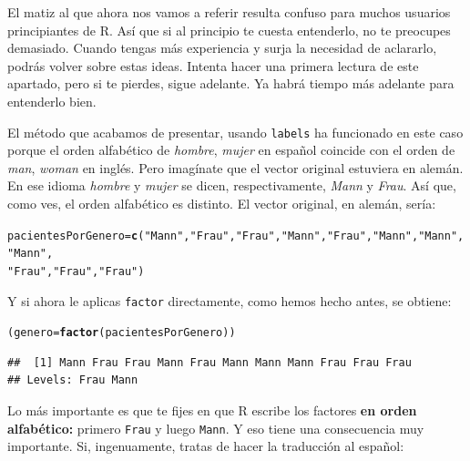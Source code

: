 \documentclass[10pt,a4paper]{article}\usepackage[]{graphicx}\usepackage[]{color}
\makeatletter
\newcommand{\hlstr}[1]{\textcolor[rgb]{0.192,0.494,0.8}{#1}}%
\newcommand{\hlstd}[1]{\textcolor[rgb]{0.345,0.345,0.345}{#1}}%
\newcommand{\hlkwb}[1]{\textcolor[rgb]{0.69,0.353,0.396}{#1}}%
\newcommand{\hlkwd}[1]{\textcolor[rgb]{0.737,0.353,0.396}{\textbf{#1}}}%
\newenvironment{kframe}{%
 \def\at@end@of@kframe{}%
 \ifinner\ifhmode%
  \def\at@end@of@kframe{\end{minipage}}%
  \begin{minipage}{\columnwidth}%
 \fi\fi%
 \def\FrameCommand##1{\hskip\@totalleftmargin \hskip-\fboxsep
 \colorbox{shadecolor}{##1}\hskip-\fboxsep
     \hskip-\linewidth \hskip-\@totalleftmargin \hskip\columnwidth}%
 \MakeFramed {\advance\hsize-\width
   \@totalleftmargin\z@ \linewidth\hsize
   \@setminipage}}%
 {\par\unskip\endMakeFramed%
 \at@end@of@kframe}
\newenvironment{knitrout}{}{} %
\makeatother
\begin{document}
El matiz al que ahora nos vamos a referir resulta confuso para muchos usuarios principiantes de R. Así que si al principio te cuesta entenderlo, no te preocupes demasiado. Cuando tengas más experiencia y surja la necesidad de aclararlo, podrás volver sobre estas ideas. Intenta hacer una primera lectura de este apartado, pero si te pierdes, sigue adelante. Ya habrá tiempo más adelante para entenderlo bien.

El método que acabamos de presentar, usando {\tt labels} ha funcionado en este caso porque el orden alfabético de {\em hombre}, {\em mujer} en español coincide con el orden de {\em man}, {\em woman} en inglés. Pero imagínate que el vector original estuviera en alemán. En ese idioma {\em hombre} y {\em mujer} se dicen, respectivamente, {\em Mann} y {\em Frau}.  Así que, como ves, el orden alfabético es distinto. El vector original, en alemán, sería:

\begin{knitrout}
\color{fgcolor}\begin{kframe}
\begin{alltt}
\hlstd{pacientesPorGenero}\hlkwb{=}\hlkwd{c}\hlstd{(}\hlstr{"Mann"}\hlstd{,} \hlstr{"Frau"}\hlstd{,} \hlstr{"Frau"}\hlstd{,} \hlstr{"Mann"}\hlstd{,} \hlstr{"Frau"}\hlstd{,} \hlstr{"Mann"}\hlstd{,} \hlstr{"Mann"}\hlstd{,} \hlstr{"Mann"}\hlstd{,}
    \hlstr{"Frau"}\hlstd{,} \hlstr{"Frau"}\hlstd{,} \hlstr{"Frau"}\hlstd{)}
\end{alltt}
\end{kframe}
\end{knitrout}
Y si ahora le aplicas {\tt factor} directamente, como hemos hecho antes, se obtiene:

\begin{knitrout}
\color{fgcolor}\begin{kframe}
\begin{alltt}
\hlstd{(genero} \hlkwb{=} \hlkwd{factor}\hlstd{(pacientesPorGenero))}
\end{alltt}
\begin{verbatim}
##  [1] Mann Frau Frau Mann Frau Mann Mann Mann Frau Frau Frau
## Levels: Frau Mann
\end{verbatim}
\end{kframe}
\end{knitrout}


Lo más importante es que te fijes en que R escribe los factores {\bf en orden alfabético:} primero {\tt Frau} y luego {\tt Mann}. Y eso tiene una consecuencia muy importante. Si, ingenuamente, tratas de hacer la traducción al español:
\end{document}
